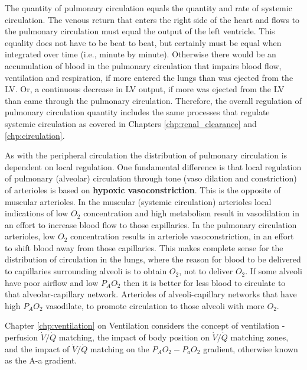 The quantity of pulmonary circulation equals the quantity and rate of systemic circulation. The venous return that enters the right side of the heart and flows to the pulmonary circulation must equal the output of the left ventricle. This equality does not have to be beat to beat, but certainly must be equal when integrated over time (i.e., minute by minute). Otherwise there would be an accumulation of blood in the pulmonary circulation that impairs blood flow, ventilation and respiration, if more entered the lungs than was ejected from the LV. Or, a continuous decrease in LV output, if more was ejected from the LV than came through the pulmonary circulation. Therefore, the overall regulation of pulmonary circulation quantity includes the same processes that regulate systemic circulation as covered in Chapters \ref{chp:renal_clearance} and \ref{chp:circulation}.

As with the peripheral circulation the distribution of pulmonary circulation is dependent on local regulation. One fundamental difference is that local regulation of pulmonary (alveolar) circulation through tone (vaso dilation and constriction) of arterioles is based on \textbf{hypoxic vasoconstriction}. This is the opposite of muscular arterioles. In the muscular (systemic circulation) arterioles local indications of low $O_2$ concentration and high metabolism result in vasodilation in an effort to increase blood flow to those capillaries. In the pulmonary circulation arterioles, low $O_2$ concentration results in arteriole vasoconstriction, in an effort to shift blood away from those capillaries. This makes complete sense for the distribution of circulation in the lungs, where the reason for blood to be delivered to capillaries surrounding alveoli is to obtain $O_2$, not to deliver $O_2$. If some alveoli have poor airflow and low $P_AO_2$ then it is better for less blood to circulate to that alveolar-capillary network. Arterioles of alveoli-capillary networks that have high $P_AO_2$ vasodilate, to promote circulation to those alveoli with more $O_2$.

Chapter \ref{chp:ventilation} on Ventilation considers the concept of ventilation - perfusion $\dot{V}/\dot{Q}$ matching, the impact of body position on $\dot{V}/\dot{Q}$ matching zones, and the impact of $\dot{V}/\dot{Q}$ matching on the $P_AO_2-P_aO_2$ gradient, otherwise known as the A-a gradient.

